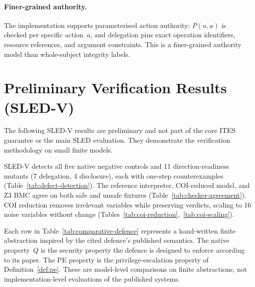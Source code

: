 \documentclass{article}
\begin{document}
\paragraph{Finer-grained authority.}
The implementation supports parameterised action authority: $P(u,a)$ is
checked per specific action~$a$, and delegation pins exact operation
identifiers, resource references, and argument constraints. This is a
finer-grained authority model than whole-subject integrity labels.

\section{Preliminary Verification Results (SLED-V)}
\label{app:sledv}

The following SLED-V results are preliminary and not part of the core ITES
guarantee or the main SLED evaluation. They demonstrate the verification
methodology on small finite models.

SLED-V detects all five native negative controls and 11 direction-readiness
mutants (7 delegation, 4 disclosure), each with one-step counterexamples
(Table~\ref{tab:defect-detection}). The reference interpreter, COI-reduced
model, and Z3 BMC agree on both safe and unsafe fixtures
(Table~\ref{tab:checker-agreement}). COI reduction removes irrelevant
variables while preserving verdicts, scaling to 16 noise variables without
change (Tables~\ref{tab:coi-reduction},~\ref{tab:coi-scaling}).

Each row in Table~\ref{tab:comparative-defence} represents a hand-written
finite abstraction inspired by the cited defence's published semantics. The
native property~$Q$ is the security property the defence is designed to
enforce according to its paper. The PE property is the privilege-escalation
property of Definition~\ref{def:pe}. These are model-level comparisons on
finite abstractions, not implementation-level evaluations of the published
systems.







\clearpage

\end{document}
